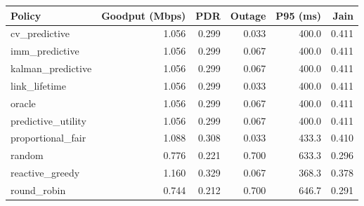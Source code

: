 \begin{tabular}{lrrrrr}
\toprule
Policy & Goodput (Mbps) & PDR & Outage & P95 (ms) & Jain \\
\midrule
cv\_predictive & 1.056 & 0.299 & 0.033 & 400.0 & 0.411 \\
imm\_predictive & 1.056 & 0.299 & 0.067 & 400.0 & 0.411 \\
kalman\_predictive & 1.056 & 0.299 & 0.067 & 400.0 & 0.411 \\
link\_lifetime & 1.056 & 0.299 & 0.033 & 400.0 & 0.411 \\
oracle & 1.056 & 0.299 & 0.067 & 400.0 & 0.411 \\
predictive\_utility & 1.056 & 0.299 & 0.067 & 400.0 & 0.411 \\
proportional\_fair & 1.088 & 0.308 & 0.033 & 433.3 & 0.410 \\
random & 0.776 & 0.221 & 0.700 & 633.3 & 0.296 \\
reactive\_greedy & 1.160 & 0.329 & 0.067 & 368.3 & 0.378 \\
round\_robin & 0.744 & 0.212 & 0.700 & 646.7 & 0.291 \\
\bottomrule
\end{tabular}
